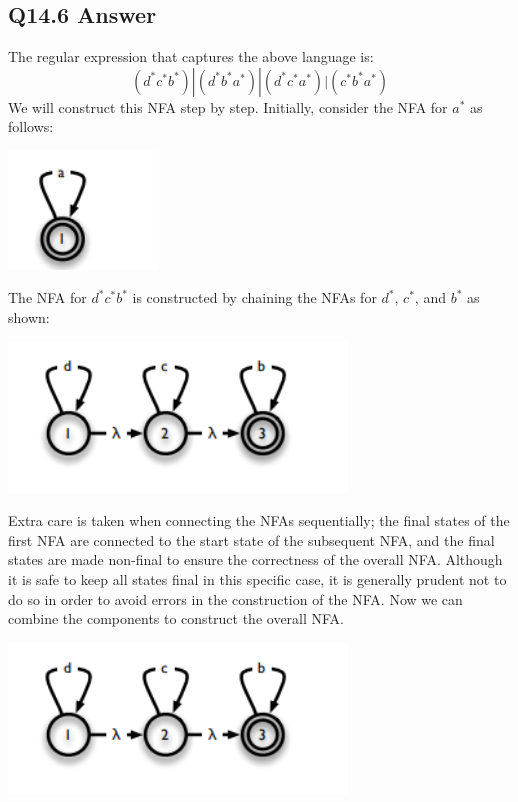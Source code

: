 \documentclass{article}
\begin{document}
\subsection*{Q14.6 Answer}
The regular expression that captures the above language is:
\[(d^*c^*b^*)|(d^*b^*a^*)|(d^*c^*a^*)|(c^*b^*a^*)\]
We will construct this NFA step by step. Initially, consider the NFA for \( a^* \) as follows:
\begin{center}
    \includegraphics[width=4cm]{10.png}
\end{center}
The NFA for \( d^*c^*b^* \) is constructed by chaining the NFAs for \( d^* \), \( c^* \), and \( b^* \) as shown:
\begin{center}
    \includegraphics[width=9cm]{11.png}
\end{center}
Extra care is taken when connecting the NFAs sequentially; the final states of the first NFA are connected to the start state of the subsequent NFA, and the final states are made non-final to ensure the correctness of the overall NFA. Although it is safe to keep all states final in this specific case, it is generally prudent not to do so in order to avoid errors in the construction of the NFA.
Now we can combine the components to construct the overall NFA.
\begin{center}
    \includegraphics[width=9cm]{11.png}
\end{center}
\newpage
\end{document}

